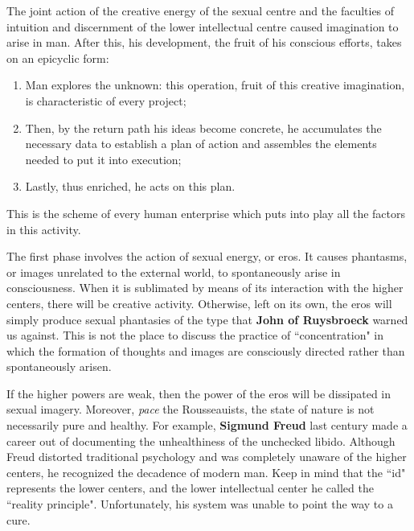 \begin{quotex}
The joint action of the creative energy of the sexual centre and the faculties of intuition and discernment of the lower intellectual centre caused imagination to arise in man. After this, his development, the fruit of his conscious efforts, takes on an epicyclic form:

\end{quotex}
\begin{enumerate}
\item \begin{quotex}
Man explores the unknown: this operation, fruit of this creative imagination, is characteristic of every project; 
\end{quotex}
\item \begin{quotex}
Then, by the return path his ideas become concrete, he accumulates the necessary data to establish a plan of action and assembles the elements needed to put it into execution; 
\end{quotex}
\item \begin{quotex}
Lastly, thus enriched, he acts on this plan. 
\end{quotex}
\end{enumerate}
\begin{quotex}
This is the scheme of every human enterprise which puts into play all the factors in this activity.

\end{quotex}
The first phase involves the action of sexual energy, or eros. It causes phantasms, or images unrelated to the external world, to spontaneously arise in consciousness. When it is sublimated by means of its interaction with the higher centers, there will be creative activity. Otherwise, left on its own, the eros will simply produce sexual phantasies of the type that \textbf{John of Ruysbroeck} warned us against. This is not the place to discuss the practice of ``concentration" in which the formation of thoughts and images are consciously directed rather than spontaneously arisen.

If the higher powers are weak, then the power of the eros will be dissipated in sexual imagery. Moreover, \emph{pace} the Rousseauists, the state of nature is not necessarily pure and healthy. For example, \textbf{Sigmund Freud} last century made a career out of documenting the unhealthiness of the unchecked libido. Although Freud distorted traditional psychology and was completely unaware of the higher centers, he recognized the decadence of modern man. Keep in mind that the ``id" represents the lower centers, and the lower intellectual center he called the ``reality principle". Unfortunately, his system was unable to point the way to a cure.

